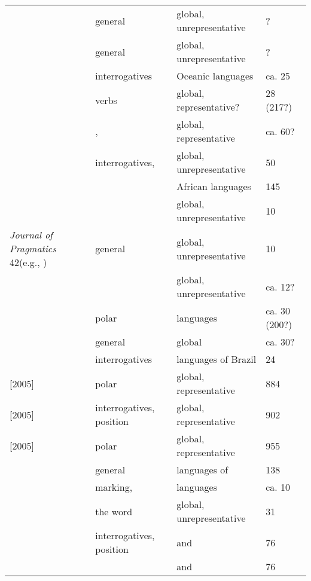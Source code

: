 \begin{table}
\begin{tabularx}{\textwidth}{Q@{~}Q@{~}Q@{~}l@{}}
\citealt{KönigSiemund2007} & general & global, unrepresentative & ?\\
\citealt{Schulze2007} & general & global, unrepresentative & ?\\
\citealt{Lichtenberk2007} & interrogatives & Oceanic languages & ca. 25\\
\citealt{Hagège2008} &  verbs & global, representative? & 28 (217?)\\
\citealt{Mauri2008} & ,  & global, representative & ca. 60?\\
\citealt{Mackenzie2009} & interrogatives,  & global, unrepresentative & 50\\
\citealt{Rialland2009} &  & African languages & 145\\
\citealt{Stivers2009} &  & global, unrepresentative & 10\\
\textit{Journal of Pragmatics} 42\newline (e.g., \citealt{Levinson2010}) & general & global, unrepresentative & 10\\
\citealt{Axelsson2011} &  & global, unrepresentative & ca. 12?\\
\citealt{Miestamo2011} & polar  &  languages & ca. 30 (200?)\\
\citealt{Dixon2012} & general & global & ca. 30?\\
\citealt{Hengeveld2012} & interrogatives & languages of Brazil & 24\\
\citealt{Dryer2013k} [2005] & polar  & global, representative & 884\\
\citealt{Dryer2013l} [2005] & interrogatives, position & global, representative & 902\\
\citealt{Dryer2013m} [2005] & polar  & global, representative & 955\\
\citealt{LuoTianhua2013} & general & languages of  & 138\\
\citealt{Hackstein2013} &  marking,
 &  languages & ca. 10\\
\citealt{DingemanseTorreiraEnfield2013} & the word \textit{} & global, unrepresentative & 31\\
\citealt{Haspelmath2013a}& interrogatives, position &  and  & 76\\
\citealt{Haspelmath2013b} &  &  and  & 76\\

\end{tabularx}
\end{table}
